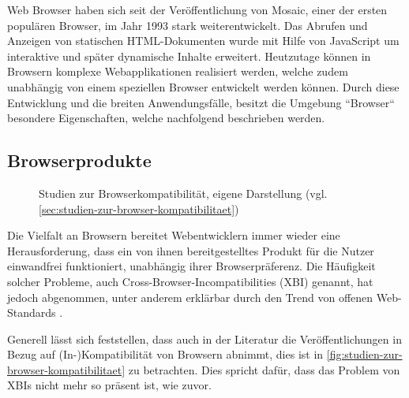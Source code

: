 Web Browser haben sich seit der Veröffentlichung von Mosaic, einer der ersten populären Browser, im Jahr 1993 stark weiterentwickelt. Das Abrufen und Anzeigen von statischen HTML-Dokumenten wurde mit Hilfe von JavaScript um interaktive und später dynamische Inhalte erweitert. Heutzutage können in Browsern komplexe Webapplikationen realisiert werden, welche zudem unabhängig von einem speziellen Browser entwickelt werden können. Durch diese Entwicklung und die breiten Anwendungsfälle, besitzt die Umgebung ``Browser`` besondere Eigenschaften, welche nachfolgend beschrieben werden.

\subsection{Browserprodukte}
\label{sec:browserprodukte}

\begin{wrapfigure}[19]{r}{0.45\textwidth}
\centering
{}
\caption{Studien zur Browserkompatibilität, eigene Darstellung (vgl. \ref{sec:studien-zur-browser-kompatibilitaet})}
\label{fig:studien-zur-browser-kompatibilitaet}
\end{wrapfigure}

Die Vielfalt an Browsern bereitet Webentwicklern immer wieder eine Herausforderung, dass ein von ihnen bereitgestelltes Produkt für die Nutzer einwandfrei funktioniert, unabhängig ihrer Browserpräferenz. Die Häufigkeit solcher Probleme, auch Cross-Browser-Incompatibilities (XBI) genannt, hat jedoch abgenommen, unter anderem erklärbar durch den Trend von offenen Web-Standards \cite{W3CStandards}.

Generell lässt sich feststellen, dass auch in der Literatur die Veröffentlichungen in Bezug auf (In-)Kompatibilität von Browsern abnimmt, dies ist in \autoref{fig:studien-zur-browser-kompatibilitaet} zu betrachten. Dies spricht dafür, dass das Problem von XBIs nicht mehr so präsent ist, wie zuvor.

